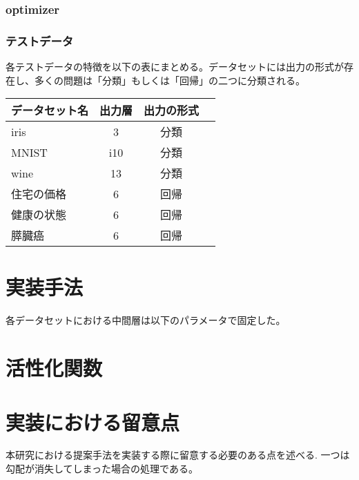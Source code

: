 \subsubsection{optimizer}
\subsubsection{テストデータ}
各テストデータの特徴を以下の表にまとめる。データセットには出力の形式が存在し、多くの問題は「分類」もしくは「回帰」の二つに分類される。


\begin{tabular}{l*{2}{c}r}
データセット名      & 出力層 & 出力の形式 \\
\hline
iris            & 3  & 分類 \\
MNIST               & i10 & 分類  \\
wine        & 13 & 分類 \\
住宅の価格           & 6 & 回帰 \\
健康の状態           & 6 & 回帰 \\
膵臓癌           & 6 & 回帰 \\
\end{tabular}





\section{実装手法}

各データセットにおける中間層は以下のパラメータで固定した。


\section{活性化関数}



\section{実装における留意点}
本研究における提案手法を実装する際に留意する必要のある点を述べる.
一つは勾配が消失してしまった場合の処理である。

\section{}

